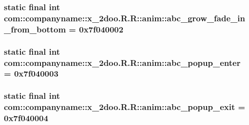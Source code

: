 \hypertarget{classcom_1_1companyname_1_1x__2doo_1_1_r_1_1anim_0bf36ceed286837c1553ef7db300be6d}{
\subsubsection[{abc\_\-grow\_\-fade\_\-in\_\-from\_\-bottom}]{\setlength{\rightskip}{0pt plus 5cm}static final int com::companyname::x\_\-2doo.R.R::anim::abc\_\-grow\_\-fade\_\-in\_\-from\_\-bottom = 0x7f040002}}
\label{classcom_1_1companyname_1_1x__2doo_1_1_r_1_1anim_0bf36ceed286837c1553ef7db300be6d}


\hypertarget{classcom_1_1companyname_1_1x__2doo_1_1_r_1_1anim_7d9badb65e726ccb2cc9645947f8ae4d}{
\subsubsection[{abc\_\-popup\_\-enter}]{\setlength{\rightskip}{0pt plus 5cm}static final int com::companyname::x\_\-2doo.R.R::anim::abc\_\-popup\_\-enter = 0x7f040003}}
\label{classcom_1_1companyname_1_1x__2doo_1_1_r_1_1anim_7d9badb65e726ccb2cc9645947f8ae4d}


\hypertarget{classcom_1_1companyname_1_1x__2doo_1_1_r_1_1anim_442377f905448c504dd208868c13cc0c}{
\subsubsection[{abc\_\-popup\_\-exit}]{\setlength{\rightskip}{0pt plus 5cm}static final int com::companyname::x\_\-2doo.R.R::anim::abc\_\-popup\_\-exit = 0x7f040004}}
\label{classcom_1_1companyname_1_1x__2doo_1_1_r_1_1anim_442377f905448c504dd208868c13cc0c}


